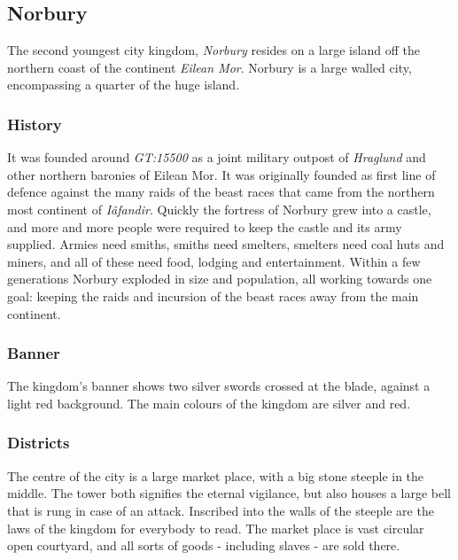 \subsection*{Norbury}


The second youngest city kingdom, \emph{Norbury} resides on a large island off
the northern coast of the continent \emph{Eilean Mor}. Norbury is a large
walled city, encompassing a quarter of the huge island.

\subsubsection*{History}

It was founded around \emph{GT:15500} as a joint military outpost of
\emph{Hraglund} and other northern baronies of Eilean Mor. It was originally
founded as first line of defence against the many raids of the beast races
that came from the northern most continent of \emph{Iâfandir}. Quickly the
fortress of Norbury grew into a castle, and more and more people were
required to keep the castle and its army supplied. Armies need smiths,
smiths need smelters, smelters need coal huts and miners, and all of
these need food, lodging and entertainment. Within a few generations
Norbury exploded in size and population, all working towards one goal:
keeping the raids and incursion of the beast races away from the main
continent.

\subsubsection*{Banner}

The kingdom's banner shows two silver swords crossed at the blade, against a
light red background. The main colours of the kingdom are silver and red.

\subsubsection*{Districts}

The centre of the city is a large market place, with a big stone steeple in
the middle. The tower both signifies the eternal vigilance, but also houses a
large bell that is rung in case of an attack. Inscribed into the walls of
the steeple are the laws of the kingdom for everybody to read. The market
place is vast circular open courtyard, and all sorts of goods - including
slaves - are sold there.

